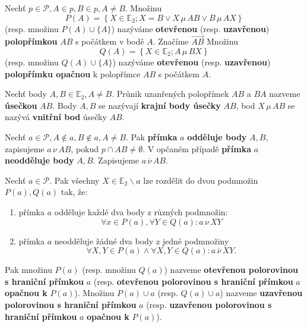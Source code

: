 \begin{definition}
  Nechť $p\in \mathscr P,A \in p, B \in p, A \ne B.$ Množinu
  \[
    P(A)=\left \{ X\in \mathbb E_2; X=B \lor X\,\mu\, AB \lor B\, \mu\, AX \right \}
  \]
  (resp. množinu $P(A)\cup \{A\}$) nazýváme \textbf{otevřenou} (resp. \textbf{uzavřenou}) \textbf{polopřímkou} $AB$ s počátkem v bodě $A$. Značíme $\overrightarrow{AB}$ Množinu
  \[
    Q(A)=\left \{ X\in \mathbb E_2; A\,\mu\, BX \right \}
  \]
  (resp. množinu $Q(A)\cup \{A\}$) nazýváme \textbf{otevřenou} (resp. \textbf{uzavřenou}) \textbf{polopřímku opačnou} k polopřímce $AB$ s počátkem $A$.
\end{definition}

\begin{definition}
  Nechť body $A,B\in \mathbb E_2, A\ne B$. Průnik uzanřených polopřímek $AB$ a $BA$ nazveme \textbf{úsečkou} $AB$. Body $A,B$ se nazývají \textbf{krajní body úsečky} $AB$, bod $X\,\mu \, AB$ se nazývá \textbf{vnitřní bod} úsečky $AB$.
\end{definition}

\begin{definition}
Nechť $a\in \mathscr P, A\notin a, B\notin a, A\ne B.$ Pak \textbf{přímka} $a$ \textbf{odděluje body} $A,B$, zapisujeme $a\, \nu\, AB$, pokud $p \cap AB \neq \emptyset$. V opčaném případě \textbf{přímka} $a$ \textbf{neodděluje body} $A,B$. Zapisujeme $a\, \overline \nu \,AB.$
\end{definition}

\begin{definition}
  Nechť $a \in \mathscr P$. Pak všechny $X\in \mathbb E_2 \smallsetminus a$ lze rozdělit do dvou podmnožin $P(a), Q(a)$ tak, že:
  \begin{enumerate}[$i.$]
    \item přímka $a$ odděluje každé dva body z různých podmnožin:
      \[
        \forall x \in P(a), \forall Y \in Q(a): a \, \nu \, XY
      \]
    \item přímka $a$ neodděluje žádné dva body z jedné podmnožiny
      \[
        \forall X, Y \in P(a) \land \forall X,Y \in Q(a): a \,\overline \nu\, XY.
      \]
  \end{enumerate}
  Pak množinu $P(a)$ (resp. množinu $Q(a)$) nazveme \textbf{otevřenou polorovinou s hraniční přímkou} $a$ (resp. \textbf{otevřenou polorovinou s hraniční přímkou} $a$ \textbf{opačnou k} $P(a)$). Množinu $P(a)\cup a$ (resp. $Q(a) \cup a$) nazveme \textbf{uzavřenou polorovinou s hraniční přímkou} $a$ (resp. \textbf{uzavřenou polorovinou s hraniční přímkou} $a$ \textbf{opačnou k} $P(a)$).
\end{definition}

